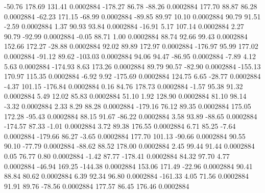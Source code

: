       -50.76      178.69      131.41     0.0002884
     -178.27       86.78      -88.26     0.0002884
      177.70       88.87       86.28     0.0002884
      -62.23      171.15      -68.99     0.0002884
      -89.85       89.97       10.10     0.0002884
       90.79       91.51       -2.59     0.0002884
        1.37       90.93       93.84     0.0002884
      -16.91        5.17      107.14     0.0002884
        2.27       90.79      -92.99     0.0002884
       -0.05       88.71        1.00     0.0002884
       88.74       92.66       99.43     0.0002884
      152.66      172.27      -28.88     0.0002884
       92.02       89.89      172.97     0.0002884
     -176.97       95.99      177.02     0.0002884
      -91.12       89.62     -103.03     0.0002884
       94.06       94.47      -86.95     0.0002884
       -7.89        4.12        5.63     0.0002884
     -174.93        8.63      173.26     0.0002884
       89.79       90.57      -82.90     0.0002884
     -155.13      170.97      115.35     0.0002884
       -6.92        9.92     -175.69     0.0002884
      124.75        6.65      -28.77     0.0002884
       -4.37      101.15     -176.84     0.0002884
        0.16       84.76      178.73     0.0002884
       -1.57       95.38       91.32     0.0002884
        5.49       12.02       85.83     0.0002884
       51.10        1.92      128.90     0.0002884
       81.10       98.14       -3.32     0.0002884
        2.33        8.29       88.28     0.0002884
     -179.16       76.12       89.35     0.0002884
      175.05      172.28      -95.43     0.0002884
       88.15       91.67      -86.22     0.0002884
        3.58       93.89      -88.65     0.0002884
     -174.57       87.33       -1.01     0.0002884
        3.72       89.38      176.55     0.0002884
        6.71       85.25       -7.64     0.0002884
     -179.66       86.27       -3.65     0.0002884
      177.70      101.13      -90.66     0.0002884
       90.55       90.10      -77.79     0.0002884
      -88.62       88.52      178.00     0.0002884
        2.45       99.44       91.44     0.0002884
        0.05       76.77        0.80     0.0002884
       -1.42       87.77     -178.41     0.0002884
       84.32       97.70        4.77     0.0002884
      -46.94      169.25     -144.38     0.0002884
      153.06      171.49      -22.96     0.0002884
       90.41       88.84       80.62     0.0002884
        6.39       92.34       96.80     0.0002884
     -161.33        4.05       71.56     0.0002884
       91.91       89.76      -78.56     0.0002884
      177.57       86.45      176.46     0.0002884
